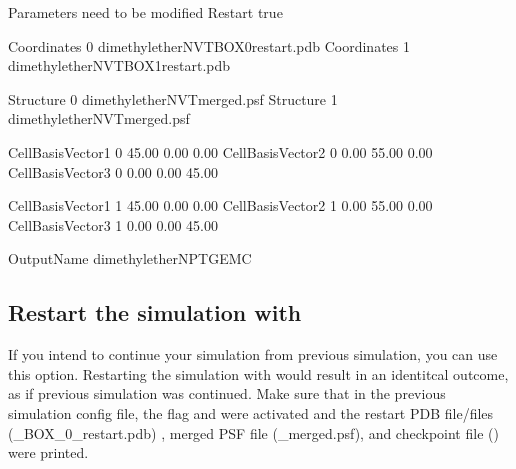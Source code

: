 \documentclass[letterpaper,10pt,english]{sphinxmanual}
\begin{document}
\begin{sphinxVerbatim}[commandchars=\\\{\}]
\PYGZsh{}\PYGZsh{}\PYGZsh{}\PYGZsh{}\PYGZsh{}\PYGZsh{}\PYGZsh{}\PYGZsh{}\PYGZsh{}\PYGZsh{}\PYGZsh{}\PYGZsh{}\PYGZsh{}\PYGZsh{}\PYGZsh{}\PYGZsh{}\PYGZsh{}\PYGZsh{}\PYGZsh{}\PYGZsh{}\PYGZsh{}\PYGZsh{}\PYGZsh{}\PYGZsh{}\PYGZsh{}\PYGZsh{}\PYGZsh{}\PYGZsh{}\PYGZsh{}\PYGZsh{}\PYGZsh{}\PYGZsh{}\PYGZsh{}\PYGZsh{}\PYGZsh{}\PYGZsh{}\PYGZsh{}\PYGZsh{}\PYGZsh{}\PYGZsh{}\PYGZsh{}\PYGZsh{}\PYGZsh{}\PYGZsh{}\PYGZsh{}\PYGZsh{}\PYGZsh{}\PYGZsh{}\PYGZsh{}\PYGZsh{}\PYGZsh{}\PYGZsh{}\PYGZsh{}\PYGZsh{}\PYGZsh{}\PYGZsh{}
\PYGZsh{} Parameters need to be modified
\PYGZsh{}\PYGZsh{}\PYGZsh{}\PYGZsh{}\PYGZsh{}\PYGZsh{}\PYGZsh{}\PYGZsh{}\PYGZsh{}\PYGZsh{}\PYGZsh{}\PYGZsh{}\PYGZsh{}\PYGZsh{}\PYGZsh{}\PYGZsh{}\PYGZsh{}\PYGZsh{}\PYGZsh{}\PYGZsh{}\PYGZsh{}\PYGZsh{}\PYGZsh{}\PYGZsh{}\PYGZsh{}\PYGZsh{}\PYGZsh{}\PYGZsh{}\PYGZsh{}\PYGZsh{}\PYGZsh{}\PYGZsh{}\PYGZsh{}\PYGZsh{}\PYGZsh{}\PYGZsh{}\PYGZsh{}\PYGZsh{}\PYGZsh{}\PYGZsh{}\PYGZsh{}\PYGZsh{}\PYGZsh{}\PYGZsh{}\PYGZsh{}\PYGZsh{}\PYGZsh{}\PYGZsh{}\PYGZsh{}\PYGZsh{}\PYGZsh{}\PYGZsh{}\PYGZsh{}\PYGZsh{}\PYGZsh{}\PYGZsh{}
Restart         true

Coordinates     0   dimethylether\PYGZus{}NVT\PYGZus{}BOX\PYGZus{}0\PYGZus{}restart.pdb
Coordinates     1   dimethylether\PYGZus{}NVT\PYGZus{}BOX\PYGZus{}1\PYGZus{}restart.pdb

Structure       0   dimethylether\PYGZus{}NVT\PYGZus{}merged.psf
Structure       1   dimethylether\PYGZus{}NVT\PYGZus{}merged.psf

\PYGZsh{}CellBasisVector1   0       45.00   0.00    0.00
\PYGZsh{}CellBasisVector2   0       0.00    55.00   0.00
\PYGZsh{}CellBasisVector3   0       0.00    0.00    45.00

\PYGZsh{}CellBasisVector1   1       45.00   0.00    0.00
\PYGZsh{}CellBasisVector2   1       0.00    55.00   0.00
\PYGZsh{}CellBasisVector3   1       0.00    0.00    45.00

OutputName          dimethylether\PYGZus{}NPT\PYGZus{}GEMC
\end{sphinxVerbatim}


\subsection{Restart the simulation with }
\label{\detokenize{howto:restart-the-simulation-with-restartcheckpoint}}
If you intend to continue your simulation from previous simulation, you can use this option. Restarting the simulation with  would result in an
identitcal outcome, as if previous simulation was continued.
Make sure that in the previous simulation config file, the flag  and  were activated and the restart PDB file/files (\_BOX\_0\_restart.pdb)
, merged PSF file (\_merged.psf), and checkpoint file () were printed.
\end{document}
